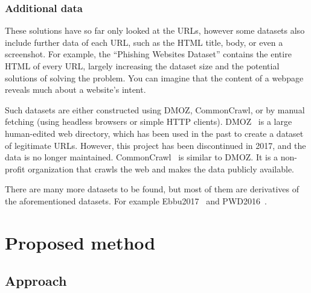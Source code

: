 \documentclass{article}
\begin{document}
    \subsubsection{Additional data}\label{subsubsec:additional-data}
    These solutions have so far only looked at the URLs, however some datasets also include further data of each URL, such as the HTML title, body, or even a screenshot.
    For example, the ``Phishing Websites Dataset''\cite{VisualizingRNNInURLDetection} contains the entire HTML of every URL, largely increasing the dataset size and the potential solutions of solving the problem.
    You can imagine that the content of a webpage reveals much about a website's intent.

    Such datasets are either constructed using DMOZ, CommonCrawl, or by manual fetching (using headless browsers\cite{PhishingLoginURLDetection} or simple HTTP clients).%
    DMOZ~\cite{DMOZ} is a large human-edited web directory, which has been used in the past to create a dataset of legitimate URLs. However, this project has been discontinued in 2017, and the data is no longer maintained.
    CommonCrawl~\cite{CommonCrawl} is similar to DMOZ. It is a non-profit organization that crawls the web and makes the data publicly available.

    There are many more datasets to be found, but most of them are derivatives of the aforementioned datasets.
    For example Ebbu2017~\cite{EBBU2017} and PWD2016~\cite{PWD2016}.

%
%
%


    \section{Proposed method}\label{sec:proposed-method}

    \subsection{Approach}\label{subsec:approach}
\end{document}
